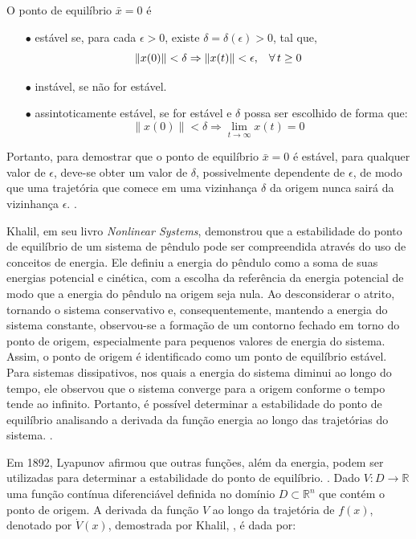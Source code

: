 \begin{definition}
  O ponto de equilíbrio $\bar{x} = 0$ é

  \begin{enumerate}
    \item[$\bullet$] estável se, para cada $\epsilon > 0$, existe $\delta = \delta(\epsilon) > 0$, tal que,
          $$ \lVert x(0)\rVert < \delta \Rightarrow \lVert x(t)\rVert < \epsilon, \hspace{0.3cm} \forall \, t \geq 0$$
    \item[$\bullet$] instável, se não for estável.
    \item[$\bullet$] assintoticamente estável, se for estável e $\delta$ possa   ser escolhido de forma que:
          $$ \lVert x(0)\rVert < \delta \Rightarrow \lim_{t \rightarrow \infty}x(t) = 0$$
  \end{enumerate}
\end{definition}

Portanto, para demostrar que o ponto de equilíbrio $\bar{x} = 0$ é estável, para qualquer valor de $\epsilon$, deve-se obter um valor de $\delta$, possivelmente dependente de $\epsilon$, de modo que uma trajetória que comece em uma vizinhança $\delta$ da origem nunca sairá da vizinhança $\epsilon$. \cite{khalil2002}.

Khalil, em seu livro \textit{Nonlinear Systems}, demonstrou que a estabilidade do ponto de equilíbrio de um sistema de pêndulo pode ser compreendida através do uso de conceitos de energia. Ele definiu a energia do pêndulo como a soma de suas energias potencial e cinética, com a escolha da referência da energia potencial de modo que a energia do pêndulo na origem seja nula. Ao desconsiderar o atrito, tornando o sistema conservativo e, consequentemente, mantendo a energia do sistema constante, observou-se a formação de um contorno fechado em torno do ponto de origem, especialmente para pequenos valores de energia do sistema. Assim, o ponto de origem é identificado como um ponto de equilíbrio estável. Para sistemas dissipativos, nos quais a energia do sistema diminui ao longo do tempo, ele observou que o sistema converge para a origem conforme o tempo tende ao infinito. Portanto, é possível determinar a estabilidade do ponto de equilíbrio analisando a derivada da função energia ao longo das trajetórias do sistema. \cite{khalil2002}.

Em 1892, Lyapunov afirmou que outras funções, além da energia, podem ser utilizadas para determinar a estabilidade do ponto de equilíbrio. \cite{lyapunov1892}. Dado $V : D \rightarrow \mathbb{R}$ uma função contínua diferenciável definida no domínio $D \subset \mathbb{R}^n$ que contém o ponto de origem. A derivada da função $V$ ao longo da trajetória de $f(x)$, denotado por $\dot{V}(x)$, demostrada por Khalil, \cite{khalil2002}, é dada por:

